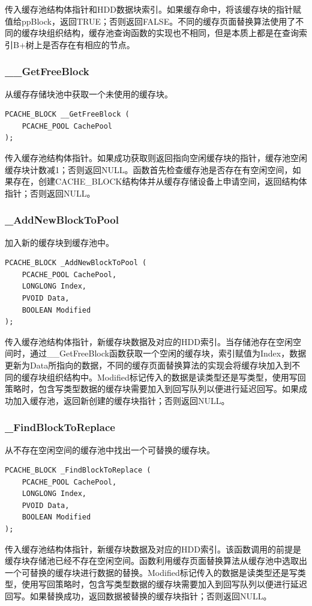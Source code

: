 传入缓存池结构体指针和HDD数据块索引。如果缓存命中，将该缓存块的指针赋值给ppBlock，返回TRUE；否则返回FALSE。不同的缓存页面替换算法使用了不同的缓存块组织结构，缓存池查询函数的实现也不相同，但是本质上都是在查询索引B+树上是否存在有相应的节点。

\subsubsection{\_\_GetFreeBlock}
从缓存存储块池中获取一个未使用的缓存块。
\begin{lstlisting}
PCACHE_BLOCK __GetFreeBlock (
    PCACHE_POOL CachePool
);
\end{lstlisting}

传入缓存池结构体指针。如果成功获取则返回指向空闲缓存块的指针，缓存池空闲缓存块计数减1；否则返回NULL。函数首先检查缓存池是否存在有空闲空间，如果存在，创建CACHE\_BLOCK结构体并从缓存存储设备上申请空间，返回结构体指针；否则返回NULL。

\subsubsection{\_AddNewBlockToPool}
加入新的缓存块到缓存池中。
\begin{lstlisting}
PCACHE_BLOCK _AddNewBlockToPool (
    PCACHE_POOL CachePool,
    LONGLONG Index,
    PVOID Data,
    BOOLEAN Modified
);
\end{lstlisting}

传入缓存池结构体指针，新缓存块数据及对应的HDD索引。当存储池存在空闲空间时，通过\_\_GetFreeBlock函数获取一个空闲的缓存块，索引赋值为Index，数据更新为Data所指向的数据，不同的缓存页面替换算法的实现会将缓存块加入到不同的缓存块组织结构中。Modified标记传入的数据是读类型还是写类型，使用写回策略时，包含写类型数据的缓存块需要加入到回写队列以便进行延迟回写。如果成功加入缓存池，返回新创建的缓存块指针；否则返回NULL。

\subsubsection{\_FindBlockToReplace}
从不存在空闲空间的缓存池中找出一个可替换的缓存块。
\begin{lstlisting}
PCACHE_BLOCK _FindBlockToReplace (
    PCACHE_POOL CachePool,
    LONGLONG Index,
    PVOID Data,
    BOOLEAN Modified
);
\end{lstlisting}

传入缓存池结构体指针，新缓存块数据及对应的HDD索引。该函数调用的前提是缓存块存储池已经不存在空闲空间。函数利用缓存页面替换算法从缓存池中选取出一个可替换的缓存块进行数据的替换。Modified标记传入的数据是读类型还是写类型，使用写回策略时，包含写类型数据的缓存块需要加入到回写队列以便进行延迟回写。如果替换成功，返回数据被替换的缓存块指针；否则返回NULL。

